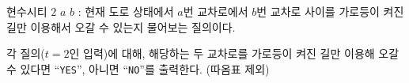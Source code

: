 \begin{problem}{현수시티}
$2$ $a$ $b$ : 현재 도로 상태에서 $a$번 교차로에서 $b$번 교차로 사이를 가로등이 켜진 길만 이용해서 오갈 수 있는지 물어보는 질의이다.

\OutputFile

각 질의($t=2$인 입력)에 대해, 해당하는 두 교차로를 가로등이 켜진 길만 이용해 오갈 수 있다면 ``\texttt{YES}'', 아니면 ``\texttt{NO}''를 출력한다. (따옴표 제외)

\Examples
	
\begin{example}
%
\end{example} 

\end{problem}
